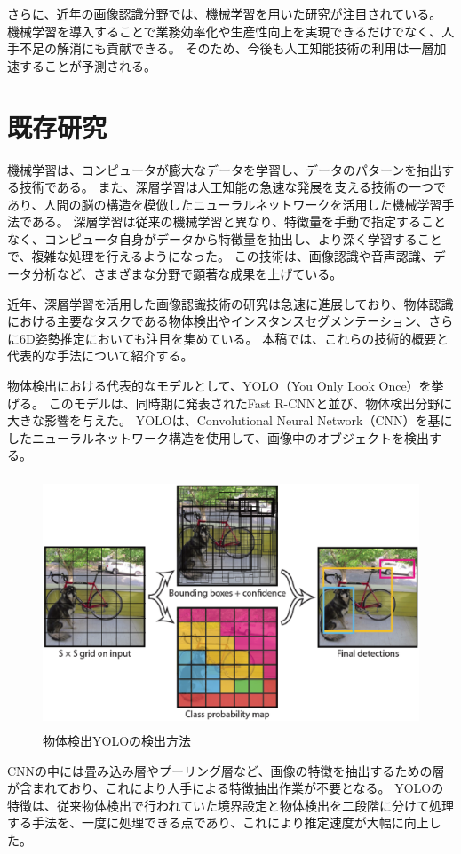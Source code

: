 さらに、近年の画像認識分野では、機械学習を用いた研究が注目されている。
機械学習を導入することで業務効率化や生産性向上を実現できるだけでなく、人手不足の解消にも貢献できる。
そのため、今後も人工知能技術の利用は一層加速することが予測される。



\section{既存研究}
機械学習は、コンピュータが膨大なデータを学習し、データのパターンを抽出する技術である。
また、深層学習は人工知能の急速な発展を支える技術の一つであり、人間の脳の構造を模倣したニューラルネットワークを活用した機械学習手法である。
深層学習は従来の機械学習と異なり、特徴量を手動で指定することなく、コンピュータ自身がデータから特徴量を抽出し、より深く学習することで、複雑な処理を行えるようになった。
この技術は、画像認識や音声認識、データ分析など、さまざまな分野で顕著な成果を上げている。

近年、深層学習を活用した画像認識技術の研究は急速に進展しており、物体認識における主要なタスクである物体検出やインスタンスセグメンテーション、さらに6D姿勢推定においても注目を集めている。
本稿では、これらの技術的概要と代表的な手法について紹介する。

物体検出における代表的なモデルとして、YOLO（You Only Look Once）を挙げる。
このモデルは、同時期に発表されたFast R-CNNと並び、物体検出分野に大きな影響を与えた。
YOLOは、Convolutional Neural Network（CNN）を基にしたニューラルネットワーク構造を使用して、画像中のオブジェクトを検出する。
\begin{figure}[htbt]
	\centering
	 \includegraphics[height=75mm]{Figure/YOLO.eps}
	 \caption{物体検出YOLOの検出方法}
	 \label{fig:f4}
\end{figure}

CNNの中には畳み込み層やプーリング層など、画像の特徴を抽出するための層が含まれており、これにより人手による特徴抽出作業が不要となる。
YOLOの特徴は、従来物体検出で行われていた境界設定と物体検出を二段階に分けて処理する手法を、一度に処理できる点であり、これにより推定速度が大幅に向上した。

